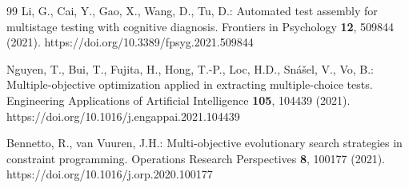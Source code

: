 \documentclass[runningheads]{llncs}
\begin{document}
\begin{thebibliography}{99}
Li, G., Cai, Y., Gao, X., Wang, D., Tu, D.: Automated test assembly for multistage testing with cognitive diagnosis. Frontiers in Psychology \textbf{12}, 509844 (2021). https://doi.org/10.3389/fpsyg.2021.509844

Nguyen, T., Bui, T., Fujita, H., Hong, T.-P., Loc, H.D., Sn\'a\v{s}el, V., Vo, B.: Multiple-objective optimization applied in extracting multiple-choice tests. Engineering Applications of Artificial Intelligence \textbf{105}, 104439 (2021). https://doi.org/10.1016/j.engappai.2021.104439

Bennetto, R., van Vuuren, J.H.: Multi-objective evolutionary search strategies in constraint programming. Operations Research Perspectives \textbf{8}, 100177 (2021). https://doi.org/10.1016/j.orp.2020.100177
\end{thebibliography}
\end{document}
